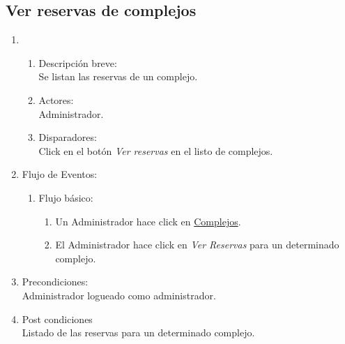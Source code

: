 \documentclass[a4paper,11pt]{article}
\begin{document}
\subsection{Ver reservas de complejos}
\begin{enumerate}

    \item
    \begin{enumerate}
    \item Descripci\'on breve: \\
        Se listan las reservas de un complejo.
    \item Actores: \\
        Administrador.
    \item Disparadores: \\
        Click en el bot\'on \emph{Ver reservas}
        en el listo de complejos.
    \end{enumerate}

    \item Flujo de Eventos:

    \begin{enumerate}

        \item Flujo b\'asico:
	\begin{enumerate}
            \item Un Administrador hace click en \underline{Complejos}.
	    \item El Administrador hace click en \emph{Ver Reservas} para un determinado complejo.
        \end{enumerate}

    \end{enumerate}

    \item Precondiciones: \\
        Administrador logueado como administrador.

    \item Post condiciones \\
        Listado de las reservas para un determinado complejo.

\end{enumerate}

\end{document}
